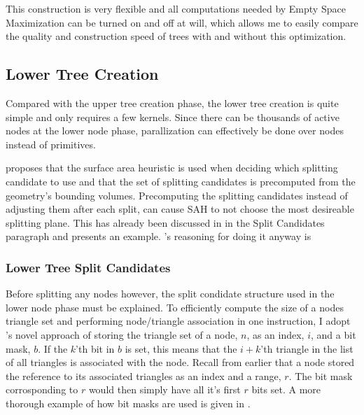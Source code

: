 This construction is very flexible and all computations needed by Empty Space
Maximization can be turned on and off at will, which allows me to easily compare
the quality and construction speed of trees with and without this optimization.

\subsection{Lower Tree Creation}\label{sec:lowerNodes}

Compared with the upper tree creation phase, the lower tree creation is quite
simple and only requires a few kernels. Since there can be thousands of active
nodes at the lower node phase, parallization can effectively be done over nodes
instead of primitives.


\zhou{} proposes that the surface area heuristic is used when deciding which
splitting candidate to use and that the set of splitting candidates is
precomputed from the geometry's bounding volumes. Precomputing the splitting
candidates instead of adjusting them after each split, can cause SAH to not
choose the most desireable splitting plane. This has already been discussed in
 in the Split Candidates paragraph and
 presents an example. \zhou's reasoning for doing it
anyway is



\subsubsection{Lower Tree Split Candidates}



Before splitting any nodes however, the split condidate structure used in the
lower node phase must be explained. To efficiently compute the size of a nodes
triangle set and performing node/triangle association in one instruction, I
adopt \zhou's novel approach of storing the triangle set of a node, $n$, as an
index, $i$, and a bit mask, $b$. If the $k$'th bit in $b$ is set, this means
that the $i+k$'th triangle in the list of all triangles is associated with the
node. Recall from earlier that a node stored the reference to its associated
triangles as an index and a range, $r$. The bit mask corrosponding to $r$ would
then simply have all it's first $r$ bits set. A more thorough example of how bit
masks are used is given in .

